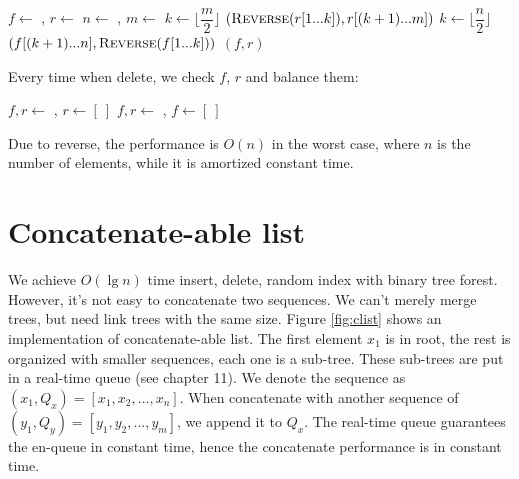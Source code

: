 \documentclass[b5paper]{article}
\begin{document}
\begin{algorithmic}[1]
  \State $f \gets$ , $r \gets$ 
  \State $n \gets$ , $m \gets$ 
    \State $k \gets \lfloor \dfrac{m}{2} \rfloor$
    \State \Return $(\textproc{Reverse}(r[1 ... k]), r[(k + 1) ... m])$
  \EndIf
    \State $k \gets \lfloor \dfrac{n}{2} \rfloor$
    \State \Return $(f[(k + 1) ... n], \textproc{Reverse}(f[1 ... k]))$
  \EndIf
  \State \Return $(f, r)$
\EndFunction
\end{algorithmic}

Every time when delete, we check $f$, $r$ and balance them:

\begin{algorithmic}[1]
  \State {}
  \State $f, r \gets$ , 
   
    \State $r \gets [\ ]$
  \Else
    \State {}
  \EndIf
\EndFunction
\Statex
{}
  \State {}
  \State $f, r \gets$ , 
   
    \State $f \gets [\ ]$
  \Else
    \State {}
  \EndIf
\EndFunction
\end{algorithmic}

Due to reverse, the performance is $O(n)$ in the worst case, where $n$ is the number of elements, while it is amortized constant time.

\begin{Exercise}
\end{Exercise}

\section{Concatenate-able list}

We achieve $O(\lg n)$ time insert, delete, random index with binary tree forest. However, it's not easy to concatenate two sequences. We can't merely merge trees, but need link trees with the same size. Figure \ref{fig:clist} shows an implementation of concatenate-able list. The first element $x_1$ is in root, the rest is organized with smaller sequences, each one is a sub-tree. These sub-trees are put in a real-time queue (see chapter 11). We denote the sequence as $(x_1, Q_x) = [x_1, x_2, ..., x_n]$. When concatenate with another sequence of $(y_1, Q_y) = [y_1, y_2, ..., y_m]$, we append it to $Q_x$. The real-time queue guarantees the en-queue in constant time, hence the concatenate performance is in constant time.
\end{document}
